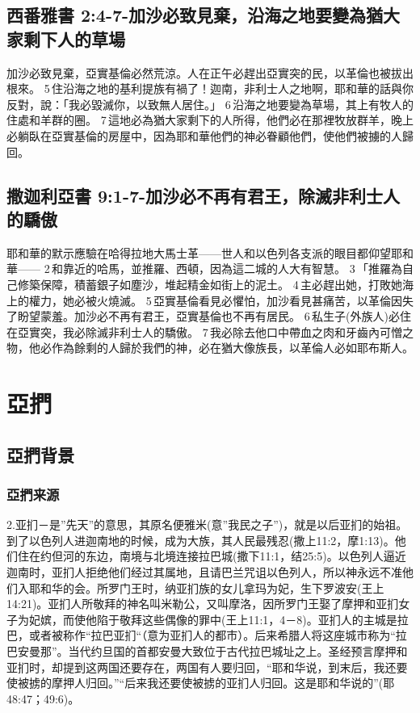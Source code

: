 \subsection{西番雅書 2:4-7-加沙必致見棄，沿海之地要變為猶大家剩下人的草場}
加沙必致見棄，亞實基倫必然荒涼。人在正午必趕出亞實突的民，以革倫也被拔出根來。 5 住沿海之地的基利提族有禍了！迦南，非利士人之地啊，耶和華的話與你反對，說：「我必毀滅你，以致無人居住。」 6 沿海之地要變為草場，其上有牧人的住處和羊群的圈。 7 這地必為猶大家剩下的人所得，他們必在那裡牧放群羊，晚上必躺臥在亞實基倫的房屋中，因為耶和華他們的神必眷顧他們，使他們被擄的人歸回。

\subsection{撒迦利亞書 9:1-7-加沙必不再有君王，除滅非利士人的驕傲}
耶和華的默示應驗在哈得拉地大馬士革——世人和以色列各支派的眼目都仰望耶和華—— 2 和靠近的哈馬，並推羅、西頓，因為這二城的人大有智慧。 3 「推羅為自己修築保障，積蓄銀子如塵沙，堆起精金如街上的泥土。 4 主必趕出她，打敗她海上的權力，她必被火燒滅。 
5 亞實基倫看見必懼怕，加沙看見甚痛苦，以革倫因失了盼望蒙羞。加沙必不再有君王，亞實基倫也不再有居民。 6 私生子(外族人)必住在亞實突，我必除滅非利士人的驕傲。 7 我必除去他口中帶血之肉和牙齒內可憎之物，他必作為餘剩的人歸於我們的神，必在猶大像族長，以革倫人必如耶布斯人。








\section{亞捫}
\subsection{亞捫背景}
\subsubsection{亞捫来源}
2.亚扪－是”先天”的意思，其原名便雅米(意”我民之子”)，就是以后亚扪的始祖。到了以色列人进迦南地的时候，成为大族，其人民最残忍(撒上11:2，摩1:13)。他们住在约但河的东边，南境与北境连接拉巴城(撒下11:1，结25:5)。以色列人逼近迦南时，亚扪人拒绝他们经过其属地，且请巴兰咒诅以色列人，所以神永远不准他们入耶和华的会。所罗门王时，纳亚扪族的女儿拿玛为妃，生下罗波安(王上14:21)。亚扪人所敬拜的神名叫米勒公，又叫摩洛，因所罗门王娶了摩押和亚扪女子为妃嫔，而使他陷于敬拜这些偶像的罪中(王上11:1，4－8)。亚扪人的主城是拉巴，或者被称作“拉巴亚扪“（意为亚扪人的都市）。后来希腊人将这座城市称为“拉巴安曼那”。当代约旦国的首都安曼大致位于古代拉巴城址之上。圣经预言摩押和亚扪时，却提到这两国还要存在，两国有人要归回，“耶和华说，到末后，我还要使被掳的摩押人归回。”“后来我还要使被掳的亚扪人归回。这是耶和华说的”(耶48:47；49:6)。

